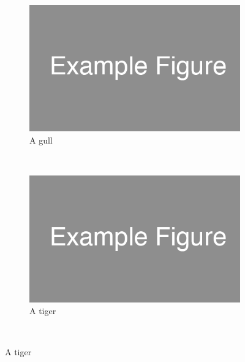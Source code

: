 \documentclass[idxtotoc,hyperref,openany,oneside]{labbook} %
\begin{document}
\begin{figure}
        \centering
        \begin{subfigure}[b]{0.3\textwidth}
                \includegraphics[width=\textwidth]{example_figure.png}
                \caption{A gull}
                \label{fig:gull}
        \end{subfigure}%
        ~ %
        \begin{subfigure}[b]{0.3\textwidth}
                \includegraphics[width=\textwidth]{example_figure.png}
                \caption{A tiger}
                \label{fig:tiger}
        \end{subfigure}
        ~ %
\end{figure}











\end{document}
